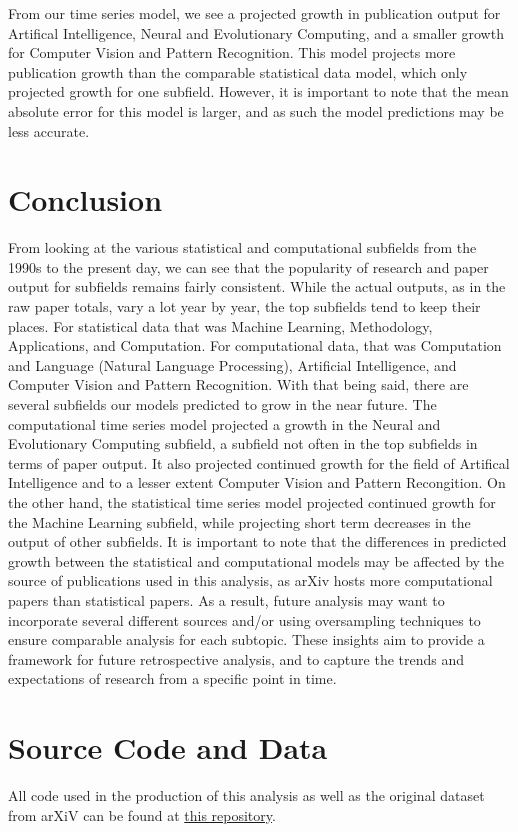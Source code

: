\documentclass[
  12pt]{article}
\begin{document}
From our time series model, we see a projected growth in publication
output for Artifical Intelligence, Neural and Evolutionary Computing,
and a smaller growth for Computer Vision and Pattern Recognition. This
model projects more publication growth than the comparable statistical
data model, which only projected growth for one subfield. However, it is
important to note that the mean absolute error for this model is larger,
and as such the model predictions may be less accurate.

\section{Conclusion}\label{sec-conc}

From looking at the various statistical and computational subfields from
the 1990s to the present day, we can see that the popularity of research
and paper output for subfields remains fairly consistent. While the
actual outputs, as in the raw paper totals, vary a lot year by year, the
top subfields tend to keep their places. For statistical data that was
Machine Learning, Methodology, Applications, and Computation. For
computational data, that was Computation and Language (Natural Language
Processing), Artificial Intelligence, and Computer Vision and Pattern
Recognition. With that being said, there are several subfields our
models predicted to grow in the near future. The computational time
series model projected a growth in the Neural and Evolutionary Computing
subfield, a subfield not often in the top subfields in terms of paper
output. It also projected continued growth for the field of Artifical
Intelligence and to a lesser extent Computer Vision and Pattern
Recongition. On the other hand, the statistical time series model
projected continued growth for the Machine Learning subfield, while
projecting short term decreases in the output of other subfields. It is
important to note that the differences in predicted growth between the
statistical and computational models may be affected by the source of
publications used in this analysis, as arXiv hosts more computational
papers than statistical papers. As a result, future analysis may want to
incorporate several different sources and/or using oversampling
techniques to ensure comparable analysis for each subtopic. These
insights aim to provide a framework for future retrospective analysis,
and to capture the trends and expectations of research from a specific
point in time.

\section{Source Code and Data}\label{source-code-and-data}

All code used in the production of this analysis as well as the original
dataset from arXiV can be found at
\href{https://github.com/narenp12/stats140finalproj}{this repository}.


  
\end{document}
